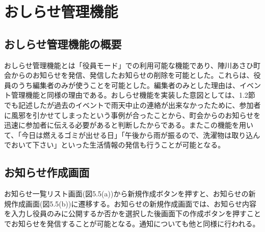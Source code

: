 \section{おしらせ管理機能}%
\subsection{おしらせ管理機能の概要}%
おしらせ管理機能とは「役員モード」での利用可能な機能であり、陣川あさひ町会からのお知らせを発信、発信したお知らせの削除を可能とした。これらは、役員のうち編集者のみが使うことを可能とした。編集者のみとした理由は、イベント管理機能と同様の理由である。おしらせ機能を実装した意図としては、1.2節でも記述したが過去のイベントで雨天中止の連絡が出来なかったために、参加者に風邪を引かせてしまったという事例が合ったことから、町会からのお知らせを迅速に参加者に伝える必要があると判断したからである。またこの機能を用いて、「今日は燃えるゴミが出せる日」「午後から雨が振るので、洗濯物は取り込んでおいて下さい」といった生活情報の発信も行うことが可能となる。


\subsection{お知らせ作成画面}%
お知らせ一覧リスト画面(図5.5(a))から新規作成ボタンを押すと、お知らせの新規作成画面(図5.5(b))に遷移する。お知らせの新規作成画面では、お知らせ内容を入力し役員のみに公開するか否かを選択した後画面下の作成ボタンを押すことでお知らせを発信することが可能となる。通知についても他と同様に行われる。

